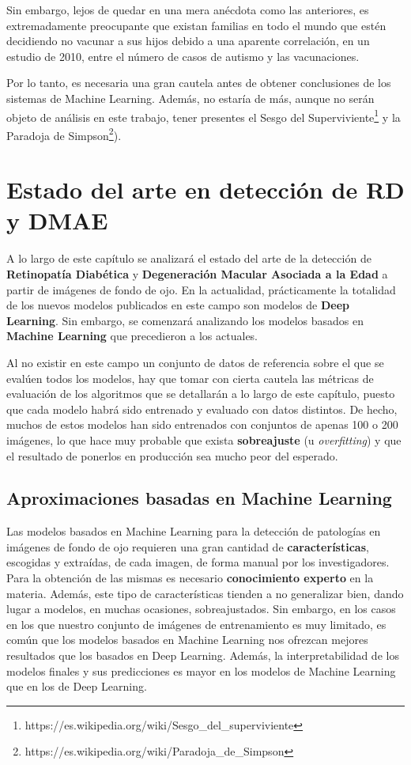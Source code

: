 \documentclass[
  12pt,
  spanish,
  a4paperpaper,
]{report}
\begin{document}
Sin embargo, lejos de quedar en una mera anécdota como las anteriores,
es extremadamente preocupante que existan familias en todo el mundo que
estén decidiendo no vacunar a sus hijos debido a una aparente
correlación, en un estudio de 2010, entre el número de casos de autismo
y las vacunaciones.

Por lo tanto, es necesaria una gran cautela antes de obtener
conclusiones de los sistemas de Machine Learning. Además, no estaría de
más, aunque no serán objeto de análisis en este trabajo, tener presentes
el Sesgo del Superviviente\footnote{https://es.wikipedia.org/wiki/Sesgo\_del\_superviviente}
y la Paradoja de Simpson\footnote{https://es.wikipedia.org/wiki/Paradoja\_de\_Simpson}).

\hypertarget{arte}{%
\chapter{Estado del arte en detección de RD y DMAE}\label{arte}}

A lo largo de este capítulo se analizará el estado del arte de la
detección de \textbf{Retinopatía Diabética} y \textbf{Degeneración
Macular Asociada a la Edad} a partir de imágenes de fondo de ojo. En la
actualidad, prácticamente la totalidad de los nuevos modelos publicados
en este campo son modelos de \textbf{Deep Learning}. Sin embargo, se
comenzará analizando los modelos basados en \textbf{Machine Learning}
que precedieron a los actuales.

Al no existir en este campo un conjunto de datos de referencia sobre el
que se evalúen todos los modelos, hay que tomar con cierta cautela las
métricas de evaluación de los algoritmos que se detallarán a lo largo de
este capítulo, puesto que cada modelo habrá sido entrenado y evaluado
con datos distintos. De hecho, muchos de estos modelos han sido
entrenados con conjuntos de apenas 100 o 200 imágenes, lo que hace muy
probable que exista \textbf{sobreajuste} (u \emph{overfitting}) y que el
resultado de ponerlos en producción sea mucho peor del esperado.

\hypertarget{aproximaciones-basadas-en-machine-learning}{%
\section{Aproximaciones basadas en Machine
Learning}\label{aproximaciones-basadas-en-machine-learning}}

Las modelos basados en Machine Learning para la detección de patologías
en imágenes de fondo de ojo requieren una gran cantidad de
\textbf{características}, escogidas y extraídas, de cada imagen, de
forma manual por los investigadores. Para la obtención de las mismas es
necesario \textbf{conocimiento experto} en la materia. Además, este tipo
de características tienden a no generalizar bien, dando lugar a modelos,
en muchas ocasiones, sobreajustados. Sin embargo, en los casos en los
que nuestro conjunto de imágenes de entrenamiento es muy limitado, es
común que los modelos basados en Machine Learning nos ofrezcan mejores
resultados que los basados en Deep Learning. Además, la
interpretabilidad de los modelos finales y sus predicciones es mayor en
los modelos de Machine Learning que en los de Deep Learning.
\end{document}
